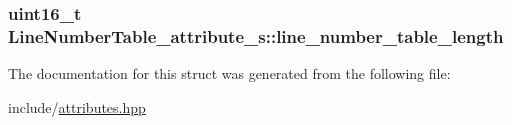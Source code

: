 \hypertarget{structLineNumberTable__attribute__s_af17b7841355aa53d48fbfe84e34729c5}{
\subsubsection[{line\+\_\+number\+\_\+table\+\_\+length}]{\setlength{\rightskip}{0pt plus 5cm}uint16\+\_\+t Line\+Number\+Table\+\_\+attribute\+\_\+s\+::line\+\_\+number\+\_\+table\+\_\+length}}\label{structLineNumberTable__attribute__s_af17b7841355aa53d48fbfe84e34729c5}


The documentation for this struct was generated from the following file\+:\begin{DoxyCompactItemize}
\item 
include/\hyperlink{attributes_8hpp}{attributes.\+hpp}\end{DoxyCompactItemize}
